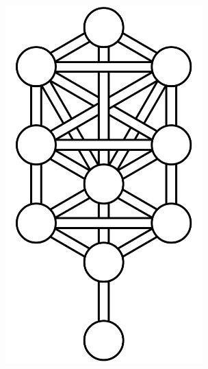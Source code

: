 \documentclass[17pt]{extreport}
\begin{document}
	\begin{figure}
		\centering
		\includegraphics[width=3in]{imageserver/uploadimages/image1.png}
	\end{figure}
	
	
	
	
	
\end{document}
